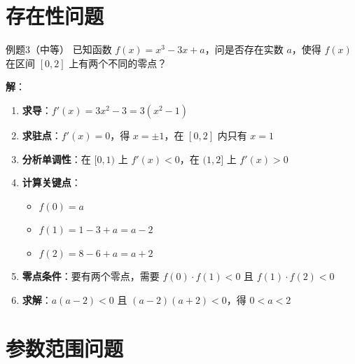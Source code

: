 \documentclass[a4paper,12pt]{ctexrep}
\begin{document}
\section{存在性问题}

\begin{examplebox}{例题3（中等）}
已知函数 $f(x) = x^3 - 3x + a$，问是否存在实数 $a$，使得 $f(x)$ 在区间 $[0, 2]$ 上有两个不同的零点？

\textbf{解}：
\begin{enumerate}
    \item \textbf{求导}：$f'(x) = 3x^2 - 3 = 3(x^2 - 1)$
    \item \textbf{求驻点}：$f'(x) = 0$，得 $x = \pm 1$，在 $[0, 2]$ 内只有 $x = 1$
    \item \textbf{分析单调性}：在 $[0, 1)$ 上 $f'(x) < 0$，在 $(1, 2]$ 上 $f'(x) > 0$
    \item \textbf{计算关键点}：
    \begin{itemize}
        \item $f(0) = a$
        \item $f(1) = 1 - 3 + a = a - 2$
        \item $f(2) = 8 - 6 + a = a + 2$
    \end{itemize}
    \item \textbf{零点条件}：要有两个零点，需要 $f(0) \cdot f(1) < 0$ 且 $f(1) \cdot f(2) < 0$
    \item \textbf{求解}：$a(a-2) < 0$ 且 $(a-2)(a+2) < 0$，得 $0 < a < 2$
\end{enumerate}
\end{examplebox}

\section{参数范围问题}
\end{document}

